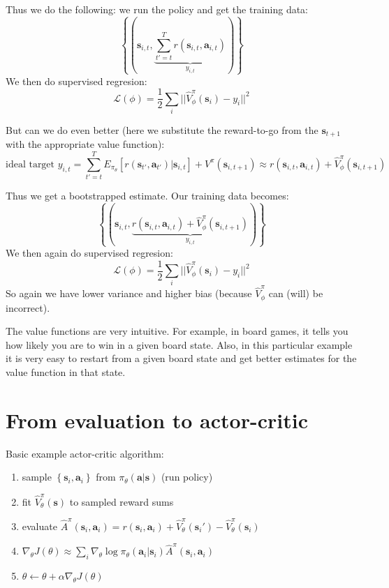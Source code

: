\documentclass{report}
\begin{document}
Thus we do the following: we run the policy and get the training data:
\begin{equation}
		\left\{ \left( \bm{s}_{i,t}, \underbrace{\sum_{t'=t}^{T} r(\bm{s}_{i,t}, \bm{a}_{i,t})}_{y_{i,t}} \right)  \right\} 
\end{equation}
We then do supervised regresion:
\begin{equation}
		\mathcal{L}(\phi) = \frac{1}{2} \sum_{i}^{} ||\hat{V}^\pi_\phi (\bm{s}_i) - y_i||^2
\end{equation}

But can we do even better (here we substitute the reward-to-go from the $\bm{s}_{t+1}$ with the appropriate value function):
\begin{equation}
		\text{ideal target } y_{i,t} = \sum_{t'=t}^{T} E_{\pi_\theta} \left[ r(\bm{s}_{t'}, \bm{a}_{t'})|\bm{s}_{i,t}\right] + V^\pi(\bm{s}_{i,t+1})  
		\approx r(\bm{s}_{i,t}, \bm{a}_{i,t}) + \hat{V}^\pi_\phi(\bm{s}_{i,t+1}) 
\end{equation}

Thus we get a bootstrapped estimate.
Our training data becomes:
\begin{equation}
		\left\{ \left( \bm{s}_{i,t}, \underbrace{r(\bm{s}_{i,t}, \bm{a}_{i,t}) + \hat{V}^\pi_\phi(\bm{s}_{i,t+1}) }_{y_{i,t}} \right)  \right\} 
\end{equation}
We then again do supervised regresion:
\begin{equation}
		\mathcal{L}(\phi) = \frac{1}{2} \sum_{i}^{} ||\hat{V}^\pi_\phi (\bm{s}_i) - y_i||^2
\end{equation}
So again we have lower variance and higher bias (because $\hat{V}^\pi_\phi$ can (will) be incorrect).

The value functions are very intuitive. For example, in board games,
it tells you how likely you are to win in a given board state.
Also, in this particular example it is very easy to restart from a given board state 
and get better estimates for the value function in that state.

\section{From evaluation to actor-critic}
Basic example actor-critic algorithm:
\begin{enumerate}
		\item sample $\left\{ \bm{s}_i, \bm{a}_i \right\}$  from  $\pi_\theta (\bm{a}|\bm{s})$ (run policy)
		\item fit $ \hat{V}^\pi_\theta(\bm{s})$ to sampled reward sums
		\item evaluate $\hat{A}^\pi (\bm{s}_{i}, \bm{a}_{i}) = r(\bm{s}_{i}, \bm{a}_{i}) + \hat{V}^\pi_\theta(\bm{s}_i') - \hat{V}^\pi_\theta(\bm{s}_i) $
		\item $\nabla_\theta J(\theta) \approx \sum_{i}^{} \nabla_{\theta} \log \pi_\theta (\bm{a}_i|\bm{s}_i) \hat{A}^\pi (\bm{s}_{i}, \bm{a}_{i})$
		\item $\theta \leftarrow \theta + \alpha \nabla_\theta J(\theta)$
\end{enumerate}
\end{document}
